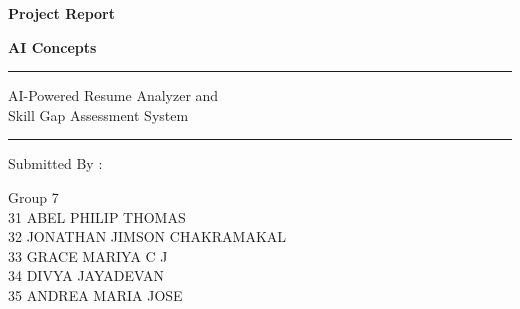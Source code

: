 \documentclass[12pt,a4paper]{article}
\begin{document}
\begin{titlepage}
    \centering
    \vspace*{1cm}
    
    \vspace{2cm}
    
    {\Huge \textbf{Project Report} \par}
    \vspace{0.8cm}
    {\Huge \textbf{AI Concepts} \par}
    
    \vspace{1.5cm}
    \noindent\rule{\textwidth}{0.4pt}
    \vspace{1cm}
    
    {\Large AI-Powered Resume Analyzer and \\[0.5em] Skill Gap Assessment System \par}
    
    \vspace{1cm}
    \noindent\rule{\textwidth}{0.4pt}
    \vspace{2cm}
    
    Submitted By : \par
    \vspace{0.8cm}
    Group 7 \\
    31 ABEL PHILIP THOMAS \\
    32 JONATHAN JIMSON CHAKRAMAKAL \\
    33 GRACE MARIYA C J \\
    34 DIVYA JAYADEVAN \\
    35 ANDREA MARIA JOSE \par
    
    \vfill
\end{titlepage}
\begin{abstract}
This report details the development of an AI-powered resume screening system designed to bridge the gap between candidate experience and recruiter efficiency. Through the integration of Large Language Models (LLMs) and advanced Natural Language Processing (NLP) techniques, the system evaluates resumes against job descriptions while emphasizing fairness and providing actionable, personalized recommendations for applicants.
\end{abstract}
\newpage

\tableofcontents
\newpage
\end{document}
